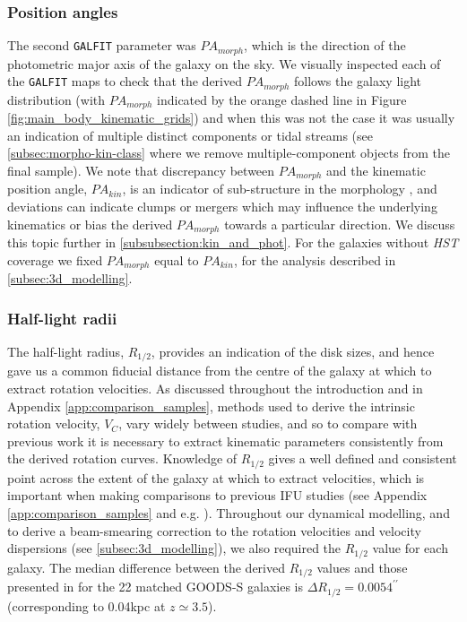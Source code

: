 \documentclass[fleqn,usenatbib]{mnras}
\begin{document}
\subsubsection{Position angles}\label{subsubsection:position_angle}
The second {\tt GALFIT} parameter was $PA_{morph}$, which is the direction of the photometric major axis of the galaxy on the sky.
We visually inspected each of the {\tt GALFIT} maps to check that the derived $PA_{morph}$ follows the galaxy light distribution (with $PA_{morph}$ indicated by the orange dashed line in Figure \ref{fig:main_body_kinematic_grids}) and when this was not the case it was usually an indication of multiple distinct components or tidal streams (see \cref{subsec:morpho-kin-class} where we remove multiple-component objects from the final sample).
We note that discrepancy between $PA_{morph}$ and the kinematic position angle, $PA_{kin}$, is an indicator of sub-structure in the morphology \citep[e.g.][]{Queyrel2012,Wisnioski2015,Rodrigues2017}, and deviations can indicate clumps or mergers which may influence the underlying kinematics or bias the derived $PA_{morph}$ towards a particular direction.
We discuss this topic further in \cref{subsubsection:kin_and_phot}.
For the galaxies without {\em HST} coverage we fixed $PA_{morph}$ equal to $PA_{kin}$, for the analysis described in \cref{subsec:3d_modelling}.


\subsubsection{Half-light radii}\label{subsubsection:half-light_radii}
The half-light radius, $R_{1/2}$, provides an indication of the disk sizes, and hence gave us a common fiducial distance from the centre of the galaxy at which to extract rotation velocities.
As discussed throughout the introduction and in Appendix \ref{app:comparison_samples}, methods used to derive the intrinsic rotation velocity, $V_{C}$, vary widely between studies, and so to compare with previous work it is necessary to extract kinematic parameters consistently from the derived rotation curves.
Knowledge of $R_{1/2}$ gives a well defined and consistent point across the extent of the galaxy at which to extract velocities, which is important when making comparisons to previous IFU studies (see Appendix \ref{app:comparison_samples} and e.g. \citealt{ForsterSchreiber2009,Epinat2012,Wisnioski2015,Stott2016,Harrison2017,Swinbank2017}).
Throughout our dynamical modelling, and to derive a beam-smearing correction to the rotation velocities and velocity dispersions (see \cref{subsec:3d_modelling}), we also required the $R_{1/2}$ value for each galaxy.
The median difference between the derived $R_{1/2}$ values and those presented in \cite{VanderWel2012} for the 22 matched GOODS-S galaxies is $\Delta R_{1/2} = 0.0054^{\prime\prime}$ (corresponding to 0.04kpc at $z\simeq3.5$). \\
\end{document}
